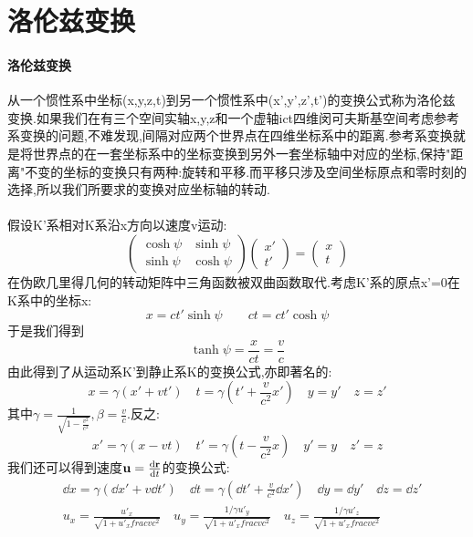 \section{洛伦兹变换}
\paragraph{洛伦兹变换} 从一个惯性系中坐标(x,y,z,t)到另一个惯性系中(x',y',z',t')的变换公式称为洛伦兹变换.如果我们在有三个空间实轴x,y,z和一个虚轴ict四维闵可夫斯基空间考虑参考系变换的问题,不难发现,间隔对应两个世界点在四维坐标系中的距离.参考系变换就是将世界点的在一套坐标系中的坐标变换到另外一套坐标轴中对应的坐标,保持"距离"不变的坐标的变换只有两种:旋转和平移.而平移只涉及空间坐标原点和零时刻的选择,所以我们所要求的变换对应坐标轴的转动.
\paragraph{}假设K'系相对K系沿x方向以速度v运动:
\begin{equation}
    \begin{pmatrix}
        \cosh\psi&\sinh\psi\\
        \sinh\psi&\cosh\psi
    \end{pmatrix}
    \begin{pmatrix}
        x'\\t'
    \end{pmatrix}
    =\begin{pmatrix}
        x\\t
    \end{pmatrix}
\end{equation}
在伪欧几里得几何的转动矩阵中三角函数被双曲函数取代.考虑K'系的原点x'=0在K系中的坐标x:
\begin{equation}
    x=ct'\sinh\psi\qquad ct=ct'\cosh\psi 
\end{equation}
于是我们得到
\begin{equation}
    \tanh\psi=\frac{x}{ct}=\frac{v}{c}
\end{equation}
由此得到了从运动系K'到静止系K的变换公式,亦即著名的:
\begin{equation}
        x=\gamma(x'+vt')\quad t=\gamma(t'+\frac{v}{c^2}x') \quad y=y' \quad z=z'
\end{equation}
其中$\gamma=\frac{1}{\sqrt{1-\frac{v^2}{c^2}}},\beta=\frac{v}{c}$.反之:
\begin{equation}
    x'=\gamma(x-vt)\quad t'=\gamma(t-\frac{v}{c^2}x) \quad y'=y \quad z'=z
\end{equation}
我们还可以得到速度$\mathbf{u}=\dv{\mathbf{r}}{t}$的变换公式:
\begin{equation}
    \begin{aligned}
        &\dd{x}=\gamma(\dd x'+v\dd{t}')\quad \dd t=\gamma(\dd t'+\frac{v}{c^2}\dd x') \quad \dd y=\dd y' \quad \dd z=\dd z'\\
        &u_x=\frac{u'_x}{\sqrt{1+u'_xfrac{v}{c^2}}}\quad u_y=\frac{1/\gamma u'_y}{\sqrt{1+u'_xfrac{v}{c^2}}}
        \quad u_z=\frac{1/\gamma u'_z}{\sqrt{1+u'_xfrac{v}{c^2}}}
    \end{aligned}
\end{equation}
